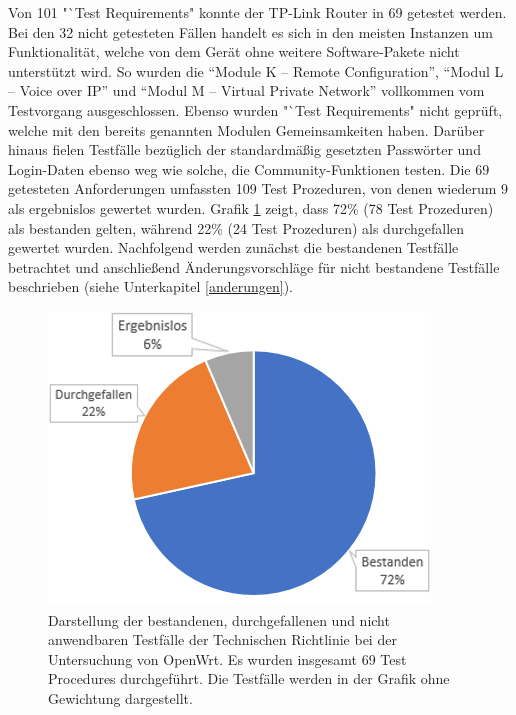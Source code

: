 \documentclass[a4paper]{book}
\begin{document}
\begin{large}
\begin{onehalfspace}
Von 101 "`Test Requirements"{} konnte der TP-Link Router in 69 getestet werden. Bei den 32 nicht getesteten Fällen handelt es sich in den meisten Instanzen um Funktionalität, welche von dem Gerät ohne weitere Software-Pakete nicht unterstützt wird. So wurden die “Module K – Remote Configuration”, “Modul L – Voice over IP” und “Modul M – Virtual Private Network” vollkommen vom Testvorgang ausgeschlossen. Ebenso wurden "`Test Requirements"{} nicht geprüft, welche mit den bereits genannten Modulen Gemeinsamkeiten haben. Darüber hinaus fielen Testfälle bezüglich der standardmäßig gesetzten Passwörter und Login-Daten ebenso weg wie solche, die Community-Funktionen testen. Die 69 getesteten Anforderungen umfassten 109 Test Prozeduren, von denen wiederum 9 als ergebnislos gewertet wurden. Grafik \ref{fig:Erfolgsrate OpenWrt} zeigt, dass 72\% (78 Test Prozeduren) als bestanden gelten, während 22\% (24 Test Prozeduren) als durchgefallen gewertet wurden. Nachfolgend werden zunächst die bestandenen Testfälle betrachtet und anschließend Änderungsvorschläge für nicht bestandene Testfälle beschrieben (siehe Unterkapitel \ref{anderungen}). \\ 

\begin{figure}[ht]
\begin{center}
\includegraphics[scale=0.65]{images/tr_stat2} 
\caption{Darstellung der bestandenen, durchgefallenen und nicht anwendbaren Testfälle der Technischen Richtlinie bei der Untersuchung von OpenWrt. Es wurden insgesamt 69 \glqq Test Procedures\grqq{} durchgeführt. Die Testfälle werden in der Grafik ohne Gewichtung dargestellt.}
\label{fig:Erfolgsrate OpenWrt}
\end{center}
\end{figure}



\end{onehalfspace}
\end{large}
\end{document}
